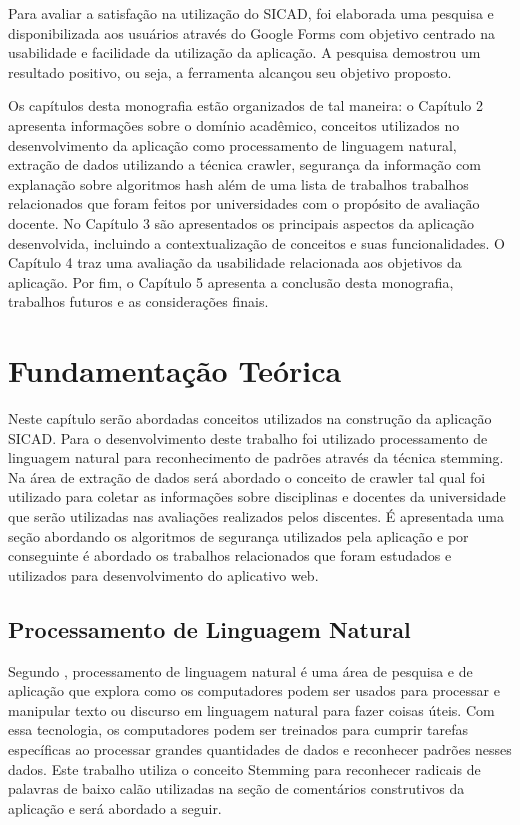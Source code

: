 \documentclass[12pt, a4paper]{report}
\begin{document}
Para avaliar a satisfação na utilização do \ac{SICAD}, foi elaborada uma pesquisa e disponibilizada aos usuários através do Google Forms com objetivo centrado na usabilidade e facilidade da utilização da aplicação. A pesquisa demostrou um resultado positivo, ou seja, a ferramenta alcançou seu objetivo proposto.

Os capítulos desta monografia estão organizados de tal maneira: o Capítulo 2 apresenta informações sobre o domínio acadêmico, conceitos utilizados no desenvolvimento da aplicação como processamento de linguagem natural, extração de dados utilizando a técnica crawler, segurança da informação com explanação sobre algoritmos hash além de uma lista de trabalhos trabalhos relacionados que foram feitos por universidades com o propósito de avaliação docente. No Capítulo 3 são apresentados os principais aspectos da aplicação desenvolvida, incluindo a contextualização de conceitos  e suas funcionalidades. O Capítulo 4 traz uma avaliação da usabilidade relacionada aos objetivos da aplicação. Por fim, o Capítulo 5 apresenta a conclusão desta monografia, trabalhos futuros e as considerações finais.

\chapter{Fundamentação Teórica}
\label{chap:fundamentacaoteorica}

Neste capítulo serão abordadas conceitos utilizados na construção da aplicação \ac{SICAD}. Para o desenvolvimento deste trabalho foi utilizado processamento de linguagem natural para reconhecimento de padrões através da técnica stemming. Na área de extração de dados será abordado o
conceito de crawler tal qual foi utilizado para coletar as informações sobre disciplinas e docentes da universidade que serão utilizadas nas avaliações realizados pelos discentes. É apresentada uma seção abordando os algoritmos de segurança utilizados pela aplicação e por conseguinte é abordado os trabalhos relacionados que foram estudados e utilizados para desenvolvimento do aplicativo web.

\section{Processamento de Linguagem Natural}

Segundo \cite{chowdhury2003}, processamento de linguagem natural é uma área de pesquisa e de aplicação que explora como os computadores podem ser usados para processar e manipular texto ou discurso em linguagem natural para fazer coisas úteis. Com essa tecnologia, os computadores podem ser treinados para cumprir tarefas específicas ao processar grandes quantidades de dados e reconhecer padrões nesses dados.
Este trabalho utiliza o conceito Stemming para reconhecer radicais de palavras de baixo calão utilizadas na seção de comentários construtivos da aplicação e será abordado a seguir.
\end{document}
